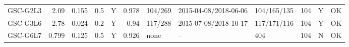 \documentclass[10pt,a4paper]{article}
\begin{document}
\begin{longtable}{lrrrcrlllrcc}
GSC-G2L3 & 2.09 & 0.155 & 0.5 & Y & 0.978 & 104/269 & 2015-04-08/2018-06-06 & 104/165/135 & 104 & Y & OK\\
GSC-G3L6 & 2.78 & 0.024 & 0.2 & Y & 0.94 & 117/288 & 2015-07-08/2018-10-17 & 117/171/116 & 104 & Y & OK\\
GSC-G6L7 & 0.799 & 0.125 & 0.5 & Y & 0.926 & none & -- & 404 & 104 & N & OK\\

\end{longtable}
\end{document}
